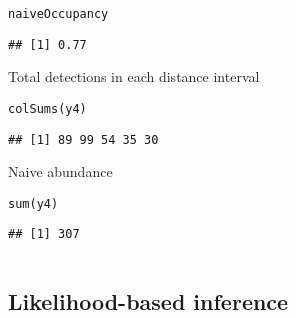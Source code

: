 \documentclass[color=usenames,dvipsnames]{beamer}\usepackage[]{graphicx}\usepackage[]{xcolor}
\makeatletter
\newcommand{\hldef}[1]{\textcolor[rgb]{0,0,0}{#1}}%
\newcommand{\hlkwd}[1]{\textcolor[rgb]{0.004,0.004,0.506}{#1}}%
\newenvironment{kframe}{%
 \def\at@end@of@kframe{}%
 \ifinner\ifhmode%
  \def\at@end@of@kframe{\end{minipage}}%
  \begin{minipage}{\columnwidth}%
 \fi\fi%
 \def\FrameCommand##1{\hskip\@totalleftmargin \hskip-\fboxsep
 \colorbox{shadecolor}{##1}\hskip-\fboxsep
     \hskip-\linewidth \hskip-\@totalleftmargin \hskip\columnwidth}%
 \MakeFramed {\advance\hsize-\width
   \@totalleftmargin\z@ \linewidth\hsize
   \@setminipage}}%
 {\par\unskip\endMakeFramed%
 \at@end@of@kframe}
\newenvironment{knitrout}{}{} %
\makeatother
\begin{document}
\begin{frame}[fragile]
\begin{columns}
\begin{column}{0.6\textwidth}
\begin{knitrout}
\begin{kframe}
\begin{alltt}
\hldef{naiveOccupancy}
\end{alltt}
\begin{verbatim}
## [1] 0.77
\end{verbatim}
\end{kframe}
\end{knitrout}
  \pause
  \vfill
  \small
  Total detections in each distance interval
  \vspace{-6pt}
\begin{knitrout}\scriptsize
{}\color{fgcolor}\begin{kframe}
\begin{alltt}
\hlkwd{colSums}\hldef{(y4)}
\end{alltt}
\begin{verbatim}
## [1] 89 99 54 35 30
\end{verbatim}
\end{kframe}
\end{knitrout}
  \pause
  \vfill
  Naive abundance
  \vspace{-6pt}
\begin{knitrout}\scriptsize
{}\color{fgcolor}\begin{kframe}
\begin{alltt}
\hlkwd{sum}\hldef{(y4)}
\end{alltt}
\begin{verbatim}
## [1] 307
\end{verbatim}
\end{kframe}
\end{knitrout}
  \end{column}
  \end{columns}
\end{frame}






\subsection{Likelihood-based inference}
\end{document}
